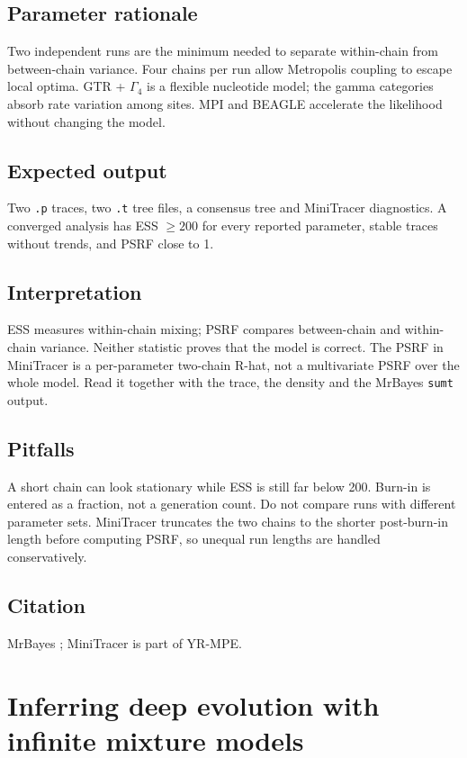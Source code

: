 \documentclass[11pt]{report}
\begin{document}
\section{Parameter rationale}
Two independent runs are the minimum needed to separate within-chain from
between-chain variance. Four chains per run allow Metropolis coupling to
escape local optima. GTR + $\Gamma_4$ is a flexible nucleotide model; the
gamma categories absorb rate variation among sites. MPI and BEAGLE accelerate
the likelihood without changing the model.

\section{Expected output}
Two \texttt{.p} traces, two \texttt{.t} tree files, a consensus tree and
MiniTracer diagnostics. A converged analysis has ESS $\ge 200$ for every
reported parameter, stable traces without trends, and PSRF close to 1.

\section{Interpretation}
ESS measures within-chain mixing; PSRF compares between-chain and
within-chain variance. Neither statistic proves that the model is correct.
The PSRF in MiniTracer is a per-parameter two-chain R-hat, not a multivariate
PSRF over the whole model. Read it together with the trace, the density and
the MrBayes \texttt{sumt} output.

\section{Pitfalls}
A short chain can look stationary while ESS is still far below 200. Burn-in is
entered as a fraction, not a generation count. Do not compare runs with
different parameter sets. MiniTracer truncates the two chains to the shorter
post-burn-in length before computing PSRF, so unequal run lengths are handled
conservatively.

\section{Citation}
MrBayes \cite{mrbayes}; MiniTracer is part of YR-MPE.

\chapter{Inferring deep evolution with infinite mixture models}
\end{document}
